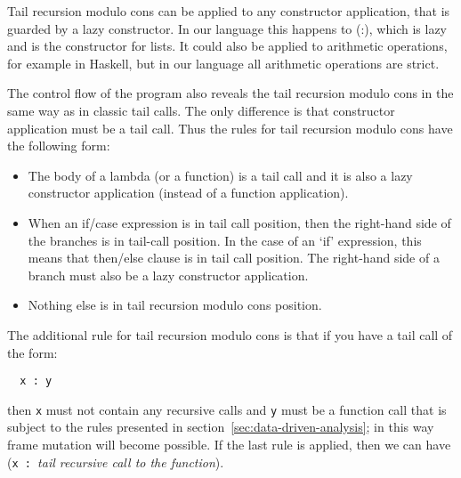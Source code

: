 \documentclass[diploma]{softlab-thesis}
\begin{document}
Tail recursion modulo cons can be applied to any constructor application, that is guarded by a lazy constructor.
In our language this happens to (:), which is lazy and is the constructor for lists. It could also be applied 
to arithmetic operations, for example in Haskell, but in our language all arithmetic operations are strict.

The control flow of the program also reveals the tail recursion modulo cons in the same way as in classic tail 
calls. The only difference is that constructor application must be a tail call. Thus the rules for tail recursion 
modulo cons have the following form:
\begin{itemize} 
  \item The body of a lambda (or a function) is a tail call and it is also a lazy constructor application
  (instead of a function application).
  \item When an if/case expression is in tail call position, then the right-hand side of the branches is in tail-call position. 
  In the case of an `if' expression, this means that then/else clause is in tail call position. The right-hand side 
  of a branch must also be a lazy constructor application.
  \item Nothing else is in tail recursion modulo cons position.
\end{itemize}


The additional rule for tail recursion modulo cons is that if you have a tail call of the form:
\begin{verbatim}
  x : y
\end{verbatim}
then \texttt{x} must not contain any recursive calls and \texttt{y} must be a function call that is subject to the 
rules presented in section~\ref{sec:data-driven-analysis}; in this way frame mutation will become possible. If the last rule is applied, 
then we can have (\texttt{x~:~}\emph{tail recursive call to the function}). 


\end{document}
